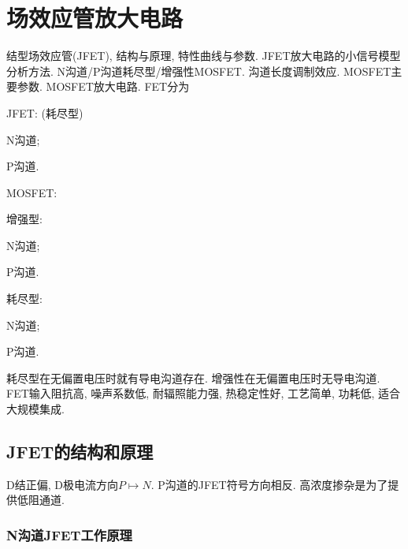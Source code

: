 \documentclass[hidelinks]{ctexart}
\begin{document}
\section{场效应管放大电路} %
\label{sec:场效应管放大电路}

\newpoint{}结型场效应管(JFET), 结构与原理, 特性曲线与参数.
\newpoint{}JFET放大电路的小信号模型分析方法.
\newpoint{}N沟道/P沟道耗尽型/增强性MOSFET.
\newpoint{}沟道长度调制效应.
\newpoint{}MOSFET主要参数.
\newpoint{}MOSFET放大电路.
FET分为
\begin{cenum}
    \item JFET: (耗尽型)
    \begin{cenum}
        \item N沟道;
        \item P沟道.
    \end{cenum}
    \item MOSFET:
    \begin{cenum}
        \item 增强型:
        \begin{cenum}
            \item N沟道;
            \item P沟道.
        \end{cenum}
        \item 耗尽型:
        \begin{cenum}
            \item N沟道;
            \item P沟道.
        \end{cenum}
    \end{cenum}
\end{cenum}
\newpoint{}耗尽型在无偏置电压时就有导电沟道存在.
\newpoint{}增强性在无偏置电压时无导电沟道.
\newpoint{}FET输入阻抗高, 噪声系数低, 耐辐照能力强, 热稳定性好, 工艺简单, 功耗低, 适合大规模集成.

\subsection{JFET的结构和原理} %
\label{sub:jfet的结构和原理}

\newpoint{}D结正偏, D极电流方向$P\mapsto N$.
\newpoint{}P沟道的JFET符号方向相反.
\newpoint{}高浓度掺杂是为了提供低阻通道.

\subsubsection{N沟道JFET工作原理} %
\label{ssub:n沟道jfet工作原理}
\end{document}
